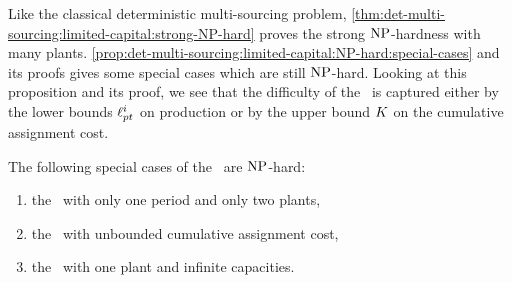 Like the classical deterministic multi-sourcing problem, \cref{thm:det-multi-sourcing:limited-capital:strong-NP-hard} proves the strong $\operatorname{NP}$-hardness with many plants.
\cref{prop:det-multi-sourcing:limited-capital:NP-hard:special-cases} and its proofs gives some special cases which are still $\operatorname{NP}$-hard.
Looking at this proposition and its proof, we see that the difficulty of the \tbc\ is captured either by the lower bounds $\ell_{pt}^i$ on production or by the upper bound $K$ on the cumulative assignment cost.




\begin{prop}\label{prop:det-multi-sourcing:limited-capital:NP-hard:special-cases}
  The following special cases of the \tbc\ are $\operatorname{NP}$-hard:
  \begin{enumerate}
    \item\label{item:det-multi-sourcing:limited-capital:NP-hard:2-plants}
    the \tbc\ with only one period and only two plants,
    \item\label{item:det-multi-sourcing:limited-capital:NP-hard:unbounded-assignment-cost}
    the \tbc\ with unbounded cumulative assignment cost,
    \item\label{item:det-multi-sourcing:limited-capital:NP-hard:infinite-capacities}
    the \tbc\ with one plant and infinite capacities.
  \end{enumerate}
\end{prop}


